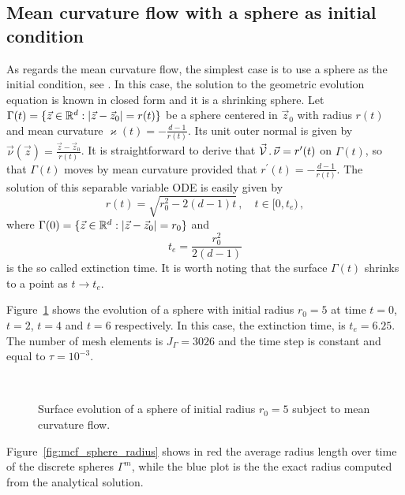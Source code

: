 \subsection{Mean curvature flow with a sphere as initial condition}
\label{subsec:mc_sphere}
As regards the mean curvature flow, the simplest case is to use a sphere as the
initial condition, see \cite{Ilmanen98}. In this case, the solution to the
geometric evolution equation is known in closed form and it is a shrinking
sphere. Let $\Gamma(t) = \{ \vec z \in {\mathbb R}^d : |\vec z -\vec z_0| = r(t) \}$ be
a sphere centered in $\vec z_0$ with radius $r(t)$ and mean curvature
$\varkappa(t) = -\frac{d-1}{r(t)}$. Its unit outer normal is given by
$\vec \nu(\vec z) = \frac{\vec z - \vec z_0}{r(t)}$. It is straightforward to
derive that $\vec{\mathcal{V}}\,.\,\vec\nu = r^{\prime}(t)$ on $\Gamma(t)$, so that
$\Gamma(t)$ moves by mean curvature provided that $r^{\prime}(t) = - \frac{d -
1}{r(t)}$. The solution of this separable variable ODE is easily given by
\begin{equation}
r(t) = \sqrt{r_0^2 - 2(d - 1)t}\,, \quad t\in [0,t_e)\,,
\end{equation}
where $\Gamma(0) = \{ \vec z \in {\mathbb R}^d : |\vec z -\vec z_0| = r_0 \}$ and
\begin{equation}
t_e=\frac{r_0^2}{2(d - 1)}
\end{equation}
is the so called extinction time. It is worth noting that the surface
$\Gamma(t)$ shrinks to a point as $t \to t_e$.

Figure~\ref{fig:mcf_sphere} shows the evolution of a sphere with initial radius
$r_0=5$ at time $t=0$, $t=2$, $t=4$ and $t=6$ respectively. In this case, the
extinction time, is $t_e=6.25$. The number of mesh elements is $J_\Gamma=3026$
and the time step is constant and equal to $\tau=10^{-3}$.

\begin{figure}[htbp]
\centering
{}
\\
\caption[Mean curvature flow shrinking sphere]{Surface evolution of a sphere of
initial radius $r_0=5$ subject to mean curvature flow.}
\label{fig:mcf_sphere}
\end{figure}

Figure~\ref{fig:mcf_sphere_radius} shows in red the average radius length
over time of the discrete spheres $\Gamma^m$, while the blue plot is the the
exact radius computed from the analytical solution.

